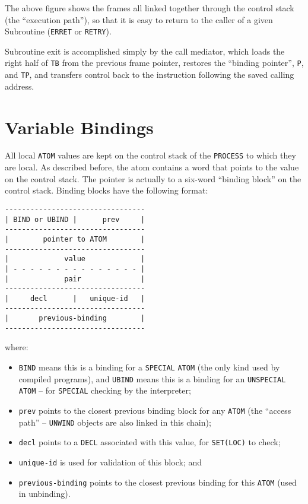 \documentclass[a4paper]{scrbook}
\providecommand{\tightlist}{%
  \setlength{\itemsep}{0pt}\setlength{\parskip}{0pt}}
\begin{document}
The above figure shows the frames all linked together through the control stack (the ``execution path''), so that it is
easy to return to the caller of a given Subroutine (\texttt{ERRET} or
\texttt{RETRY}).

Subroutine exit is accomplished simply by the call mediator, which loads the right half of \texttt{TB} from the previous
frame pointer, restores the ``binding pointer'', \texttt{P}, and \texttt{TP}, and transfers control back to the instruction
following the saved calling address.

\section*{Variable Bindings}
\label{variable-bindings}

All local \texttt{ATOM} values are kept on the control stack of the \texttt{PROCESS} to which they are local. As described
before, the atom contains a word that points to the value on the control stack. The pointer is actually to a six-word
``binding block'' on the control stack. Binding blocks have the following format:

\begin{verbatim}
---------------------------------
| BIND or UBIND |      prev     |
---------------------------------
|        pointer to ATOM        |
---------------------------------
|             value             |
| - - - - - - - - - - - - - - - |
|             pair              |
---------------------------------
|     decl      |   unique-id   |
---------------------------------
|       previous-binding        |
---------------------------------
\end{verbatim}

where:

\begin{itemize}
\tightlist
\item
  \texttt{BIND} means this is a binding for a \texttt{SPECIAL} \texttt{ATOM} (the only kind used by
  compiled programs), and \texttt{UBIND} means this is a binding for an \texttt{UNSPECIAL}
  \texttt{ATOM} -- for \texttt{SPECIAL} checking by the interpreter;
\item
  \texttt{prev} points to the closest previous binding block for any \texttt{ATOM} (the ``access path'' --
  \texttt{UNWIND} objects are also linked in this chain);
\item
  \texttt{decl} points to a \texttt{DECL} associated with this value, for \texttt{SET(LOC)} to check;
\item
  \texttt{unique-id} is used for validation of this block; and
\item
  \texttt{previous-binding} points to the closest previous binding for this \texttt{ATOM} (used in unbinding).
\end{itemize}
\end{document}
